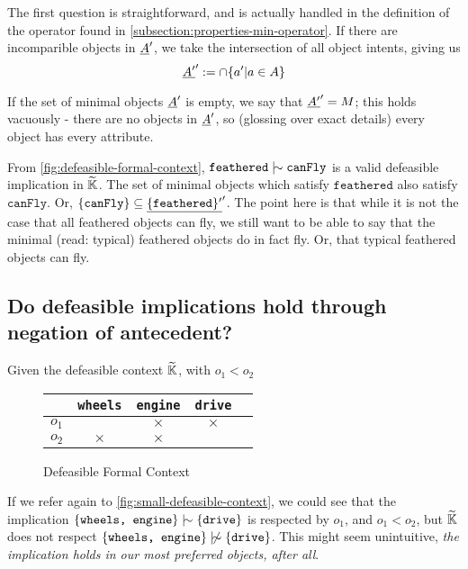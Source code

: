 \documentclass[11pt]{article}
\begin{document}
The first question is straightforward, and is actually handled in the definition of the operator found in \autoref{subsection:properties-min-operator}. If there are incomparible objects in $\underline{A}'$, we take the intersection of all object intents, giving us
\[\underline{A'}' := \cap \{a' | a \in A\}\]

If the set of minimal objects $\underline{A}'$ is empty, we say that $\underline{A'}' = M$; this holds vacuously - there are no objects in $\underline{A}'$, so (glossing over exact details) every object has every attribute.

From \autoref{fig:defeasible-formal-context}, $\texttt{feathered} \twiddle \texttt{canFly}$ is a valid defeasible implication in $\widetilde{\mathbb{K}}$. The set of minimal objects which satisfy $\texttt{feathered}$ also satisfy $\texttt{canFly}$. Or, $\{\texttt{canFly}\} \subseteq \underline{\{\texttt{feathered}\}'}'$. The point here is that while it is not the case that all feathered objects can fly, we still want to be able to say that the minimal (read: typical) feathered objects do in fact fly. Or, that typical feathered objects can fly.

\subsection{Do defeasible implications hold through negation of antecedent?}
Given the defeasible context $\widetilde{\mathbb{K}}$, with $o_1 < o_2$

\begin{figure}[h]
  \begin{center}
    \begin{tabular}{r|cccc}
            & \texttt{wheels} & \texttt{engine} & \texttt{drive} \\ \hline
      $o_1$ &                 & $\times$        & $\times$       \\
      $o_2$ & $\times$        & $\times$        &                \\
    \end{tabular}
  \end{center}
  \caption{Defeasible Formal Context}
  \label{fig:small-defeasible-context}
\end{figure}

If we refer again to \autoref{fig:small-defeasible-context}, we could see that the implication $\{\texttt{wheels, engine}\} \twiddle \{\texttt{drive}\}$ is respected by $o_1$, and $o_1 < o_2$, but $\widetilde{\mathbb{K}}$ does not respect $\{\texttt{wheels, engine}\} \ntwiddle \{\texttt{drive}\}$. This might seem unintuitive, \textit{the implication holds in our most preferred objects, after all}.
\end{document}
